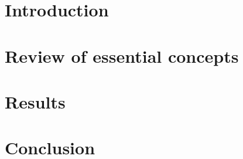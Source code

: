 \documentclass[doutorado, spanish, brazil, english]{packages/icmc}
\begin{document}
\textual

\chapter{Introduction}
\label{chapter:introducao}


\chapter{Review of essential concepts}

%

%

%

%

%

\chapter{Results}
\label{chapter:results}
%





\chapter{Conclusion}

\end{document}
